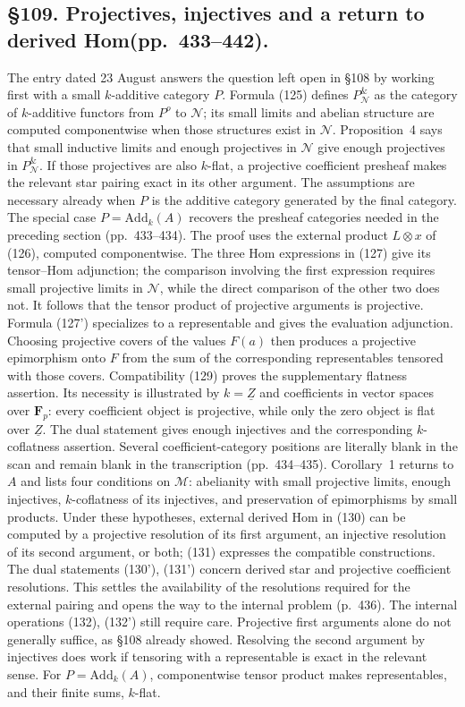 \documentclass[10pt,oneside]{book}
\begin{document}
\subsection*{\S109. Projectives, injectives and a return to derived Hom\newline (pp.\ 433--442).}
The entry dated 23 August answers the question left open in \S108 by working first with a small $k$-additive category $P$. Formula (125) defines $P^{\&}_{\mathcal N}$ as the category of $k$-additive functors from $P^o$ to $\mathcal N$; its small limits and abelian structure are computed componentwise when those structures exist in $\mathcal N$. Proposition~4 says that small inductive limits and enough projectives in $\mathcal N$ give enough projectives in $P^{\&}_{\mathcal N}$. If those projectives are also $k$-flat, a projective coefficient presheaf makes the relevant star pairing exact in its other argument. The assumptions are necessary already when $P$ is the additive category generated by the final category. The special case $P=\mathrm{Add}_k(A)$ recovers the presheaf categories needed in the preceding section (pp.\ 433--434). The proof uses the external product $L\otimes x$ of (126), computed componentwise. The three Hom expressions in (127) give its tensor--Hom adjunction; the comparison involving the first expression requires small projective limits in $\mathcal N$, while the direct comparison of the other two does not. It follows that the tensor product of projective arguments is projective. Formula (127') specializes to a representable and gives the evaluation adjunction. Choosing projective covers of the values $F(a)$ then produces a projective epimorphism onto $F$ from the sum of the corresponding representables tensored with those covers. Compatibility (129) proves the supplementary flatness assertion. Its necessity is illustrated by $k=\underline Z$ and coefficients in vector spaces over $\mathbf F_p$: every coefficient object is projective, while only the zero object is flat over $\underline Z$. The dual statement gives enough injectives and the corresponding $k$-coflatness assertion. Several coefficient-category positions are literally blank in the scan and remain blank in the transcription (pp.\ 434--435). Corollary~1 returns to $A$ and lists four conditions on $\mathcal M$: abelianity with small projective limits, enough injectives, $k$-coflatness of its injectives, and preservation of epimorphisms by small products. Under these hypotheses, external derived Hom in (130) can be computed by a projective resolution of its first argument, an injective resolution of its second argument, or both; (131) expresses the compatible constructions. The dual statements (130'), (131') concern derived star and projective coefficient resolutions. This settles the availability of the resolutions required for the external pairing and opens the way to the internal problem (p.\ 436). The internal operations (132), (132') still require care. Projective first arguments alone do not generally suffice, as \S108 already showed. Resolving the second argument by injectives does work if tensoring with a representable is exact in the relevant sense. For $P=\mathrm{Add}_k(A)$, componentwise tensor product makes representables, and their finite sums, $k$-flat. 
\end{document}
